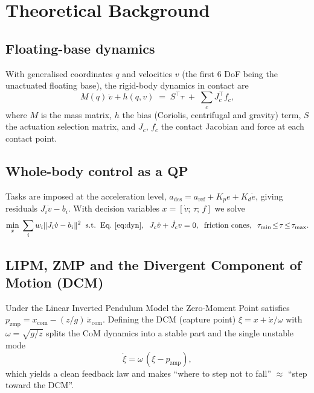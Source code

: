 \documentclass[11pt]{article}
\begin{document}
\section{Theoretical Background}
\label{sec:theory}

\subsection{Floating-base dynamics}
With generalised coordinates $q$ and velocities $v$ (the first 6 DoF being the
unactuated floating base), the rigid-body dynamics in contact are
\begin{equation}
    M(q)\,\dot v + h(q,v) \;=\; S^{\top}\tau \;+\; \textstyle\sum_c J_c^{\top} f_c ,
    \label{eq:dyn}
\end{equation}
where $M$ is the mass matrix, $h$ the bias (Coriolis, centrifugal and gravity)
term, $S$ the actuation selection matrix, and $J_c,\,f_c$ the contact Jacobian
and force at each contact point.

\subsection{Whole-body control as a QP}
Tasks are imposed at the acceleration level, $a_{\mathrm{des}} = a_{\mathrm{ref}}
+ K_p e + K_d \dot e$, giving residuals $J_i\dot v - b_i$. With decision variables
$x=[\dot v;\,\tau;\,f]$ we solve
\begin{equation}
    \min_{x}\; \sum_i w_i \lVert J_i\dot v - b_i\rVert^2
    \;\; \text{s.t.}\;\;
    \text{Eq.~\eqref{eq:dyn}},\;\; J_c\dot v + \dot J_c v = 0,\;\;
    \text{friction cones},\;\; \tau_{\min}\!\le\!\tau\!\le\!\tau_{\max}.
    \label{eq:wbc}
\end{equation}

\subsection{LIPM, ZMP and the Divergent Component of Motion (DCM)}
Under the Linear Inverted Pendulum Model the Zero-Moment Point satisfies
$p_{\mathrm{zmp}} = x_{\mathrm{com}} - (z/g)\,\ddot x_{\mathrm{com}}$. Defining the
DCM (capture point) $\xi = x + \dot x/\omega$ with $\omega=\sqrt{g/z}$ splits the
CoM dynamics into a stable part and the single unstable mode
\begin{equation}
    \dot\xi = \omega\,(\xi - p_{\mathrm{zmp}}),
    \label{eq:dcm}
\end{equation}
which yields a clean feedback law and makes ``where to step not to fall''
$\approx$ ``step toward the DCM''.
\end{document}
